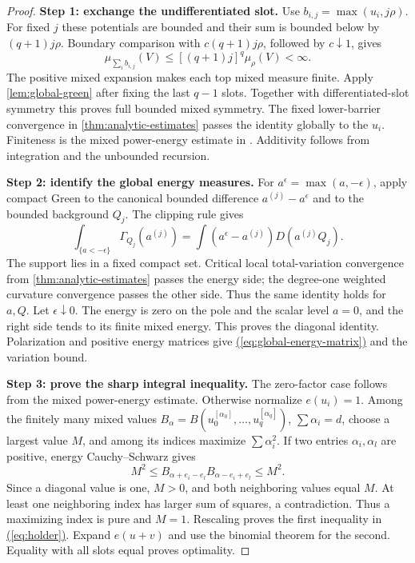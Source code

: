 \documentclass[11pt,reqno]{amsart}
\theoremstyle{definition}
\theoremstyle{remark}
\numberwithin{equation}{section}
\newcommand{\MathEqref}[1]{\begingroup\hypersetup{linkcolor=EquationLink}\hyperref[#1]{(\ref*{#1})}\endgroup}
\begin{document}
\begin{proof}
\textbf{Step 1: exchange the undifferentiated slot.}
Use $b_{i,j}=\max(u_i,j\rho)$. For fixed $j$ these potentials are
bounded and their sum is bounded below by $(q+1)j\rho$. Boundary
comparison with $c(q+1)j\rho$, followed by $c\downarrow1$, gives
\[
 \mu_{\sum_i b_{i,j}}(V)
       \le[(q+1)j]^q\mu_\rho(V)<\infty.
\]
The positive mixed expansion makes each top mixed measure finite.
Apply \cref{lem:global-green} after fixing the last $q-1$ slots.
Together with differentiated-slot symmetry this proves full bounded
mixed symmetry. The fixed lower-barrier convergence in
\cref{thm:analytic-estimates} passes the identity globally to the
$u_i$. Finiteness is the mixed power-energy estimate in
\cite[(PE11)]{Energy}. Additivity follows from integration and the
unbounded recursion.

\textbf{Step 2: identify the global energy measures.}
For $a^\epsilon=\max(a,-\epsilon)$, apply compact Green to the
canonical bounded difference $a^{(j)}-a^\epsilon$ and to the bounded
background $Q_j$. The clipping rule gives
\[
 \int_{\{a<-\epsilon\}}\Gamma_{Q_j}(a^{(j)})
       =\int(a^\epsilon-a^{(j)})D(a^{(j)}Q_j).
\]
The support lies in a fixed compact set. Critical local total-variation
convergence from \cref{thm:analytic-estimates} passes the energy side;
the degree-one weighted curvature convergence passes the other side.
Thus the same identity holds for $a,Q$. Let $\epsilon\downarrow0$.
The energy is zero on the pole and the scalar level $a=0$, and the
right side tends to its finite mixed energy. This proves the diagonal
identity. Polarization and positive energy matrices give
\MathEqref{eq:global-energy-matrix} and the variation bound.

\textbf{Step 3: prove the sharp integral inequality.}
The zero-factor case follows from the mixed power-energy estimate.
Otherwise normalize $e(u_i)=1$. Among the finitely many mixed values
$B_\alpha=B(u_0^{[\alpha_0]},\ldots,u_q^{[\alpha_q]})$,
$\sum\alpha_i=d$, choose a largest value $M$, and among its indices
maximize $\sum\alpha_i^2$. If two entries $\alpha_i,\alpha_l$ are
positive, energy Cauchy--Schwarz gives
\[
 M^2\le B_{\alpha+e_i-e_l}B_{\alpha-e_i+e_l}\le M^2.
\]
Since a diagonal value is one, $M>0$, and both neighboring values
equal $M$. At least one neighboring index has larger sum of squares,
a contradiction. Thus a maximizing index is pure and $M=1$.
Rescaling proves the first inequality in \MathEqref{eq:holder}.
Expand $e(u+v)$ and use the binomial theorem for the second. Equality
with all slots equal proves optimality.
\end{proof}
\end{document}
